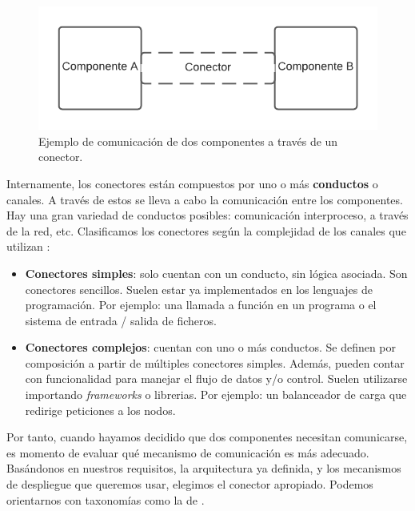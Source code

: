 
\begin{figure}[h!]
  \centering
  \includegraphics[scale=0.78]{cap_arquitectura/images/conector}
  \caption{Ejemplo de comunicación de dos componentes a través de un conector.}
  \label{fig:componentesYConectorEjemplo}
\end{figure}

Internamente, los conectores están compuestos por uno o más \textbf{conductos} o canales. A través de estos se lleva a cabo la comunicación entre los componentes. Hay una gran variedad de conductos posibles: comunicación interproceso, a través de la red, etc. Clasificamos los conectores según la complejidad de los canales que utilizan \cite{mehtaTaxonomySoftwareConnectors2000}:

\pagebreak

\begin{itemize}
    \item \textbf{Conectores simples}: solo cuentan con un conducto, sin lógica asociada. Son conectores sencillos. Suelen estar ya implementados en los lenguajes de programación. Por ejemplo: una llamada a función en un programa o el sistema de entrada / salida de ficheros.

    \item \textbf{Conectores complejos}: cuentan con uno o más conductos. Se definen por composición a partir de múltiples conectores simples. Además, pueden contar con funcionalidad para manejar el flujo de datos y/o control. Suelen utilizarse importando \emph{frameworks} o librerias. Por ejemplo: un balanceador de carga que redirige peticiones a los nodos.
\end{itemize}

Por tanto, cuando hayamos decidido que dos componentes necesitan comunicarse, es momento de evaluar qué mecanismo de comunicación es más adecuado. Basándonos en nuestros requisitos, la arquitectura ya definida, y los mecanismos de despliegue que queremos usar, elegimos el conector apropiado. Podemos orientarnos con taxonomías como la de \cite{mehtaTaxonomySoftwareConnectors2000}.

